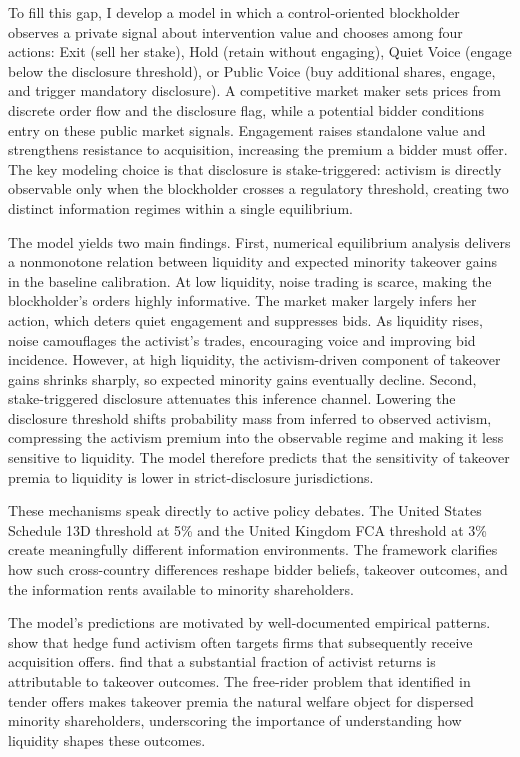 \documentclass[11pt]{article}
\newcommand{\1}{\mathbf{1}}
\begin{document}
To fill this gap, I develop a model in which a control-oriented blockholder observes a private signal about intervention value and chooses among four actions: Exit (sell her stake), Hold (retain without engaging), Quiet Voice (engage below the disclosure threshold), or Public Voice (buy additional shares, engage, and trigger mandatory disclosure). A competitive market maker sets prices from discrete order flow and the disclosure flag, while a potential bidder conditions entry on these public market signals. Engagement raises standalone value and strengthens resistance to acquisition, increasing the premium a bidder must offer. The key modeling choice is that disclosure is stake-triggered: activism is directly observable only when the blockholder crosses a regulatory threshold, creating two distinct information regimes within a single equilibrium.

The model yields two main findings. First, numerical equilibrium analysis delivers a nonmonotone relation between liquidity and expected minority takeover gains in the baseline calibration. At low liquidity, noise trading is scarce, making the blockholder's orders highly informative. The market maker largely infers her action, which deters quiet engagement and suppresses bids. As liquidity rises, noise camouflages the activist's trades, encouraging voice and improving bid incidence. However, at high liquidity, the activism-driven component of takeover gains shrinks sharply, so expected minority gains eventually decline. Second, stake-triggered disclosure attenuates this inference channel. Lowering the disclosure threshold shifts probability mass from inferred to observed activism, compressing the activism premium into the observable regime and making it less sensitive to liquidity. The model therefore predicts that the sensitivity of takeover premia to liquidity is lower in strict-disclosure jurisdictions.

These mechanisms speak directly to active policy debates. The United States Schedule 13D threshold at 5\% and the United Kingdom FCA threshold at 3\% create meaningfully different information environments. The framework clarifies how such cross-country differences reshape bidder beliefs, takeover outcomes, and the information rents available to minority shareholders.

The model's predictions are motivated by well-documented empirical patterns. \citet{BravJiangPartnoyThomas2008} show that hedge fund activism often targets firms that subsequently receive acquisition offers. \citet{GreenwoodSchor2009} find that a substantial fraction of activist returns is attributable to takeover outcomes. The free-rider problem that \citet{GrossmanHart1980} identified in tender offers makes takeover premia the natural welfare object for dispersed minority shareholders, underscoring the importance of understanding how liquidity shapes these outcomes.
\end{document}
